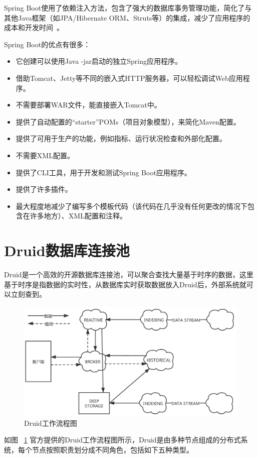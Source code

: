 Spring Boot使用了依赖注入方法，包含了强大的数据库事务管理功能，简化了与其他Java框架（如JPA/Hibernate ORM、Struts等）的集成，减少了应用程序的成本和开发时间~\cite{gblSpringBoot}。

Spring Boot的优点有很多：
\begin{itemize}
    \item 它创建可以使用Java -jar启动的独立Spring应用程序。
    \item 借助Tomcat、Jetty等不同的嵌入式HTTP服务器，可以轻松调试Web应用程序。
    \item 不需要部署WAR文件，能直接嵌入Tomcat中。
    \item 提供了自动配置的“starter”POMs（项目对象模型），来简化Maven配置。
    \item 提供了可用于生产的功能，例如指标、运行状况检查和外部化配置。
    \item 不需要XML配置。
    \item 提供了CLI工具，用于开发和测试Spring Boot应用程序。
    \item 提供了许多插件。
    \item 最大程度地减少了编写多个模板代码（该代码在几乎没有任何更改的情况下包含在许多地方）、XML配置和注释。
\end{itemize}

\section{Druid数据库连接池}
Druid是一个高效的开源数据库连接池，可以聚合查找大量基于时序的数据，这里基于时序是指数据的实时性，从数据库实时获取数据放入Druid后，外部系统就可以立刻查到。

\begin{figure}[htbp!]
    \centering
    \includegraphics[width=5in]{FIGs/chapter2/druid.pdf}
    \caption{Druid工作流程图}\label{fig_druidCH2}
\end{figure}
如图
~\ref{fig_druidCH2}
官方提供的Druid工作流程图所示，Druid是由多种节点组成的分布式系统，每个节点按照职责划分成不同角色，包括如下五种类型。

